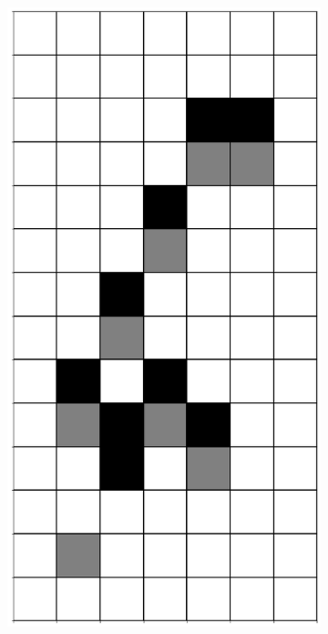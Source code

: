 \documentclass[12pt]{article}
\numberwithin{figure}{section} %
\begin{document}
\begin{figure}[H]
\begin{subfigure}{0.3\textwidth}
     \subcaption{}
   \end{subfigure}
     \begin{subfigure}{0.3\textwidth}
     \centering
     \includegraphics[angle=270,width=\linewidth]{Section4/12.1}
     \subcaption{}
   \end{subfigure}

\end{figure}
\end{document}
